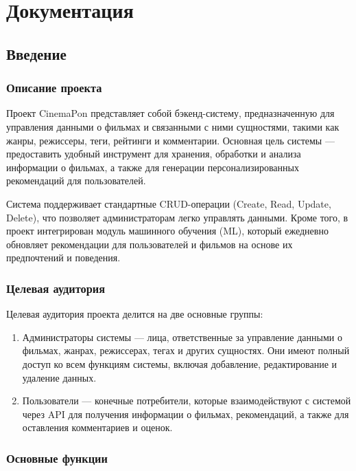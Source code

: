 \chapter{Документация}
\label{ch:docs}

\hypertarget{ux432ux432ux435ux434ux435ux43dux438ux435}{%
\section{Введение}\label{ux432ux432ux435ux434ux435ux43dux438ux435}}

\hypertarget{ux43eux43fux438ux441ux430ux43dux438ux435-ux43fux440ux43eux435ux43aux442ux430}{%
\subsection*{Описание
проекта}\label{ux43eux43fux438ux441ux430ux43dux438ux435-ux43fux440ux43eux435ux43aux442ux430}}

Проект CinemaPon представляет собой бэкенд-систему,
предназначенную для управления данными о фильмах и связанными с ними
сущностями, такими как жанры, режиссеры, теги, рейтинги и комментарии.
Основная цель системы --- предоставить удобный инструмент для хранения,
обработки и анализа информации о фильмах, а также для генерации
персонализированных рекомендаций для пользователей.

Система поддерживает стандартные CRUD-операции (Create, Read, Update,
Delete), что позволяет администраторам легко управлять данными. Кроме
того, в проект интегрирован модуль машинного обучения (ML), который
ежедневно обновляет рекомендации для пользователей и фильмов на основе
их предпочтений и поведения.

\hypertarget{ux446ux435ux43bux435ux432ux430ux44f-ux430ux443ux434ux438ux442ux43eux440ux438ux44f}{%
\subsection*{Целевая
аудитория}\label{ux446ux435ux43bux435ux432ux430ux44f-ux430ux443ux434ux438ux442ux43eux440ux438ux44f}}

Целевая аудитория проекта делится на две основные группы: 
\begin{enumerate}
    \item 
Администраторы системы --- лица, ответственные за управление
данными о фильмах, жанрах, режиссерах, тегах и других сущностях. Они
имеют полный доступ ко всем функциям системы, включая добавление,
редактирование и удаление данных. 
    \item 
Пользователи --- конечные
потребители, которые взаимодействуют с системой через API для получения
информации о фильмах, рекомендаций, а также для оставления комментариев
и оценок.
\end{enumerate}
\hypertarget{ux43eux441ux43dux43eux432ux43dux44bux435-ux444ux443ux43dux43aux446ux438ux438}{%
\subsection*{Основные
функции}\label{ux43eux441ux43dux43eux432ux43dux44bux435-ux444ux443ux43dux43aux446ux438ux438}}

